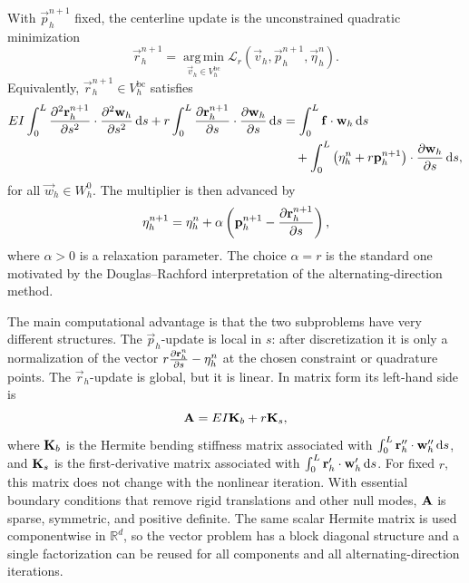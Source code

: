 With \(\vec p_h^{n+1}\) fixed, the centerline update is the unconstrained
quadratic minimization
\begin{equation}\label{eq:addm-r-update-min}
    \vec r_h^{n+1}
    =
    \operatorname*{arg\,min}_{\vec v_h\in V_h^{\mathrm{bc}}}
    \mathcal{L}_r(\vec v_h,\vec p_h^{n+1},\vec \eta_h^n).
\end{equation}
Equivalently, \(\vec r_h^{n+1}\in V_h^{\mathrm{bc}}\) satisfies
\begin{equation}\label{eq:addm-r-update-weak}
    \begin{split}
        EI
        \int_0^L
        \pdv[2]{\vec r_h^{n+1}}{s}
        \cdot
        \pdv[2]{\vec w_h}{s}
        \odif{s}
        +
        r
        \int_0^L
        \pdv{\vec r_h^{n+1}}{s}
        \cdot
        \pdv{\vec w_h}{s}
        \odif{s}
         & =
        \int_0^L
        \vec f \cdot \vec w_h
        \odif{s}
        \\
         & \quad +
        \int_0^L
        \left(
        \vec \eta_h^n
        +
        r\vec p_h^{n+1}
        \right)
        \cdot
        \pdv{\vec w_h}{s}
        \odif{s},
    \end{split}
\end{equation}
for all \(\vec w_h\in W_h^0\). The multiplier is then advanced by
\begin{equation}\label{eq:addm-multiplier-update}
    \mathbf{\eta}_h^{n+1}
    =
    \mathbf{\eta}_h^n
    +
    \alpha
    \left(
    \mathbf{p}_h^{n+1}
    -
    \pdv{\mathbf{r}_h^{n+1}}{s}
    \right),
\end{equation}
where \(\alpha>0\) is a relaxation parameter. The choice \(\alpha=r\) is the
standard one motivated by the Douglas--Rachford interpretation of the
alternating-direction method.

The main computational advantage is that the two subproblems have very
different structures. The \(\vec p_h\)-update is local in \(s\): after
discretization it is only a normalization of the vector \(r\pdv{\mathbf{r}_h^n}{s}-\mathbf{\eta}_h^n\) at the chosen constraint or quadrature points. The
\(\vec r_h\)-update is global, but it is linear. In matrix form its left-hand
side is
\begin{equation}\label{eq:addm-linear-system-matrix}
    \mathbf{A}
    =
    EI\mathbf{K}_b
    +
    r\mathbf{K}_s,
\end{equation}
where \(\mathbf{K}_b\) is the Hermite bending stiffness matrix associated with
\(\int_0^L \vec r_h''\cdot\vec w_h''\odif{s}\), and \(\mathbf{K}_s\) is the
first-derivative matrix associated with
\(\int_0^L \vec r_h'\cdot\vec w_h'\odif{s}\). For fixed \(r\), this matrix does
not change with the nonlinear iteration. With essential boundary conditions
that remove rigid translations and other null modes, \(\mathbf{A}\) is sparse,
symmetric, and positive definite. The same scalar Hermite matrix is used
componentwise in \(\mathbb{R}^d\), so the vector problem has a block diagonal
structure and a single factorization can be reused for all components and all
alternating-direction iterations.

